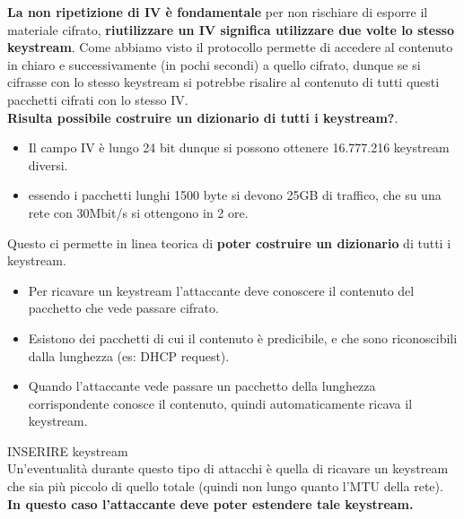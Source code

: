 \documentclass[12pt]{article}
\begin{document}
				\textbf{La non ripetizione di IV è fondamentale} per non rischiare di esporre il materiale cifrato, \textbf{riutilizzare un IV significa utilizzare due volte lo stesso keystream}. Come abbiamo visto il protocollo permette di accedere al contenuto in chiaro e successivamente (in pochi secondi) a quello cifrato, dunque se si cifrasse con lo stesso keystream si potrebbe risalire al contenuto di tutti questi pacchetti cifrati con lo stesso IV.\\
				\textbf{Risulta possibile costruire un dizionario di tutti i keystream?}.
				\begin{itemize}
					\item Il campo IV è lungo 24 bit dunque si possono ottenere 16.777.216 keystream diversi.
					\item essendo i pacchetti lunghi 1500 byte si devono 25GB di traffico, che su una rete con 30Mbit/s si ottengono in 2 ore.
				\end{itemize}
				Questo ci permette in linea teorica di \textbf{poter costruire un dizionario} di tutti i keystream.
				\begin{itemize}
					\item  Per ricavare un keystream l’attaccante deve conoscere il
					contenuto del pacchetto che vede passare cifrato.
					\item Esistono dei pacchetti di cui il contenuto è predicibile, e
					che sono riconoscibili dalla lunghezza (es: DHCP
					request).
					\item Quando l’attaccante vede passare un pacchetto della
					lunghezza corrispondente conosce il contenuto, quindi
					automaticamente ricava il keystream.
				\end{itemize}
					
				INSERIRE keystream \\
				
				Un'eventualità durante questo tipo di attacchi è quella di ricavare un keystream che sia più piccolo di quello totale (quindi non lungo quanto l'MTU della rete). \textbf{In questo caso l'attaccante deve poter estendere tale keystream.}
				
\end{document}
